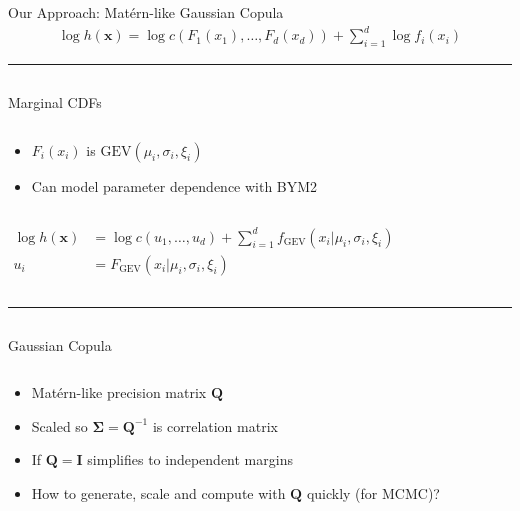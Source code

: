 \documentclass[
  ignorenonframetext,
]{beamer}
\providecommand{\tightlist}{%
  \setlength{\itemsep}{0pt}\setlength{\parskip}{0pt}}\usepackage{longtable,booktabs,array}
\begin{document}
\begin{frame}{Our Approach: Matérn-like Gaussian Copula}
\label{our-approach-matuxe9rn-like-gaussian-copula}
\[
\begin{gathered}
\log h(\mathbf x) = \log c\left(F_1(x_1), \dots, F_d(x_d)\right) + \sum_{i=1}^d \log f_i(x_i)
\end{gathered}
\]

\begin{center}\rule{0.5\linewidth}{0.5pt}\end{center}

\begin{columns}[T]
\begin{block}{Marginal CDFs}
\label{marginal-cdfs}
\begin{column}{0.5\textwidth}
\begin{itemize}
\tightlist
\item
  \(F_i(x_i)\) is \(\mathrm{GEV}(\mu_i, \sigma_i, \xi_i)\)
\item
  Can model parameter dependence with BYM2
\end{itemize}
\end{column}

\begin{column}{0.5\textwidth}
\[
\begin{aligned}
\log h(\mathbf x) &= \log c(u_1, \dots, u_d) + \sum_{i=1}^d f_{\mathrm{GEV}}(x_i \vert \mu_i, \sigma_i, \xi_i) \\
u_i &= F_{\mathrm{GEV}}(x_i \vert \mu_i, \sigma_i, \xi_i)
\end{aligned}
\]
\end{column}
\end{block}
\end{columns}

\begin{center}\rule{0.5\linewidth}{0.5pt}\end{center}

\begin{columns}[T]
\begin{block}{Gaussian Copula}
\label{gaussian-copula}
\begin{column}{0.5\textwidth}
\begin{itemize}
\tightlist
\item
  Matérn-like precision matrix \(\mathbf{Q}\)
\item
  Scaled so \(\boldsymbol{\Sigma} = \mathbf{Q}^{-1}\) is correlation
  matrix
\item
  If \(\mathbf{Q} = \mathbf{I}\) simplifies to independent margins
\item
  How to generate, scale and compute with \(\mathbf{Q}\) quickly (for
  MCMC)?
\end{itemize}
\end{column}


\end{block}
\end{columns}
\end{frame}
\end{document}
